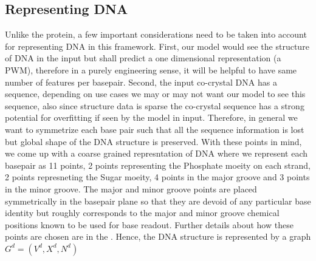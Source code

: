 \subsection{Representing DNA}
Unlike the protein, a few important considerations need to be taken into account for representing
DNA in this framework. First, our model would see the structure of DNA in the input but shall predict a one
dimensional representation (a PWM), therefore in a purely engineering sense, it will be helpful to
have same number of features per basepair. Second, the input co-crystal DNA has a sequence, depending on
use cases we may or may not want our model to see this sequence, also since structure data is sparse
the  co-crystal sequence has a strong potential for overfitting if seen by the model in input.
Therefore, in general we want to symmetrize each base pair such that all the sequence information is
lost but global shape of the DNA structure is preserved.
With these points in mind, we come up with a coarse grained represntation of DNA
where we represent each basepair as 11 points, 2 points representing the Phosphate moeity on each
strand, 2 points represneting the Sugar moeity, 4 points in the major groove and 3 points in the minor
groove. The major and minor groove points are placed symmetrically in the basepair plane so that
they are devoid of any particular base identity but roughly corresponds to the major and minor
groove chemical positions known  to be used for base readout. Further
details about how these points are chosen are in the . Hence, the DNA structure is represented by
a graph $G^d = (V^d, X^d, N^d)$
